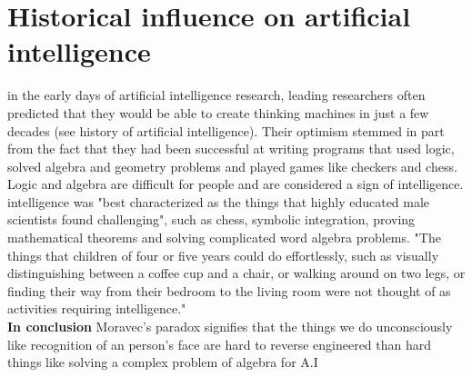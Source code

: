 \documentclass[a4paper]{article}
\begin{document}
\section{Historical influence on artificial intelligence}
in the early days of artificial intelligence research, leading researchers often predicted that they would be able to create thinking machines in just a few decades (see history of artificial intelligence). Their optimism stemmed in part from the fact that they had been successful at writing programs that used logic, solved algebra and geometry problems and played games like checkers and chess. Logic and algebra are difficult for people and are considered a sign of intelligence. intelligence was "best characterized as the things that highly educated male scientists found challenging", such as chess, symbolic integration, proving mathematical theorems and solving complicated word algebra problems. "The things that children of four or five years could do effortlessly, such as visually distinguishing between a coffee cup and a chair, or walking around on two legs, or finding their way from their bedroom to the living room were not thought of as activities requiring intelligence."\\
\textbf{In conclusion} Moravec's paradox signifies that the things we do unconsciously like recognition of an person's face are hard to reverse engineered
than hard things like solving a complex problem of algebra for A.I 
\end{document}
